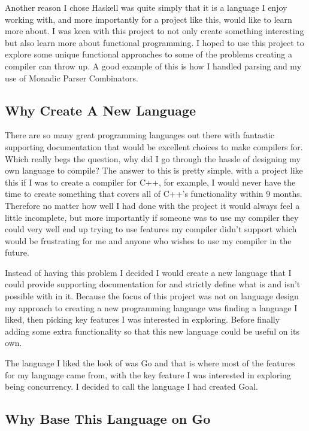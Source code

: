 Another reason I chose Haskell was quite simply that it is a language I enjoy working with, and more importantly for a project like this, would like to learn more about. I was keen with this project to not only create something interesting but also learn more about functional programming. I hoped to use this project to explore some  unique functional approaches to some of the problems creating a compiler can throw up. A good example of this is how I handled parsing and my use of Monadic Parser Combinators.

\subsection{Why Create A New Language}

There are so many great programming languages out there with fantastic supporting documentation that would be excellent choices to make compilers for. Which really begs the question, why did I go through the hassle of designing my own language to compile? The answer to this is pretty simple, with a project like this if I was to create a compiler for C++, for example, I would never have the time to create something that covers all of C++'s functionality within 9 months. Therefore no matter how well I had done with the project it would always feel a little incomplete, but more importantly if someone was to use my compiler they could very well end up trying to use features my compiler didn't support which would be frustrating for me and anyone who wishes to use my compiler in the future.

Instead of having this problem I decided I would create a new language that I could provide supporting documentation for and strictly define what is and isn't possible with in it. Because the focus of this project was not on language design my approach to creating a new programming language was finding a language I liked, then picking key features I was interested in exploring. Before finally adding some extra functionality so that this new language could be useful on its own.

The language I liked the look of was Go and that is where most of the features for my language came from, with the key feature I was interested in exploring being concurrency. I decided to call the language I had created Goal.

\subsection{Why Base This Language on Go} 

